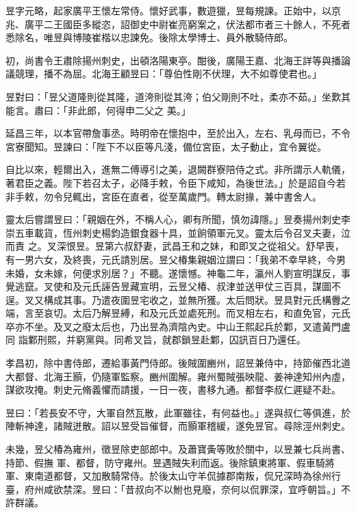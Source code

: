 \begin{pinyinscope}
 昱字元略，起家廣平王懷左常侍。懷好武事，數遊獵，昱每規諫。正始中，以京兆、廣平二王國臣多縱恣，詔御史中尉崔亮窮案之，伏法都市者三十餘人，不死者悉除名，唯昱與博陵崔楷以忠諫免。後除太學博士、員外散騎侍郎。



 初，尚書令王肅除揚州刺史，出頓洛陽東亭。酣後，廣陽王嘉、北海王詳等與播論議競理，播不為屈。北海王顧昱曰：「尊伯性剛不伏理，大不如尊使君也。」



 昱對曰：「昱父道隆則從其隆，道洿則從其洿；伯父剛則不吐，柔亦不茹。」坐歎其能言。肅曰：「非此郎，何得申二父之
 美。」



 延昌三年，以本官帶詹事丞。時明帝在懷抱中，至於出入，左右、乳母而已，不令宮寮聞知。昱諫曰：「陛下不以臣等凡淺，備位宮臣，太子動止，宜令翼從。



 自比以來，輕爾出入，進無二傅導引之美，退闕群寮陪侍之式。非所謂示人軌儀，著君臣之義。陛下若召太子，必降手敕，令臣下咸知，為後世法。」於是詔自今若非手敕，勿令兒輒出，宮臣在直者，從至萬歲門。轉太尉掾，兼中書舍人。



 靈太后嘗謂昱曰：「親姻在外，不稱人心，卿有所聞，慎勿諱隱。」昱奏揚州刺史李崇五車載貨，恆州刺史楊鈞造銀食器十具，並餉領軍元叉。靈太后令召叉夫妻，泣而責
 之。叉深恨昱。昱第六叔舒妻，武昌王和之妹，和即叉之從祖父。舒早喪，有一男六女，及終喪，元氏請別居。昱父椿集親姻泣謂曰：「我弟不幸早終，今男未婚，女未嫁，何便求別居？」不聽。遂懷憾。神龜二年，瀛州人劉宣明謀反，事覺逃竄。叉使和及元氏誣告昱藏宣明，云昱父椿、叔津並送甲仗三百具，謀圖不逞。叉又構成其事。乃遣夜圍昱宅收之，並無所獲。太后問狀。昱具對元氏構釁之端，言至哀切。太后乃解昱縛，和及元氏並處死刑。而叉相左右，和直免官，元氏卒亦不坐。及叉之廢太后也，乃出昱為濟陰內史。中山王熙起兵於鄴，叉遣黃門盧同
 詣鄴刑熙，并窮黨與。同希叉旨，就郡鎖昱赴鄴，囚訊百日乃還任。



 孝昌初，除中書侍郎，遷給事黃門侍郎。後賊圍豳州，詔昱兼侍中，持節催西北道大都督、北海王顥，仍隨軍監察。豳州圍解。雍州蜀賊張映龍、姜神達知州內虛，謀欲攻掩。刺史元脩義懼而請援，一日一夜，書移九通。都督李叔仁遲疑不赴。



 昱曰：「若長安不守，大軍自然瓦散，此軍雖往，有何益也。」遂與叔仁等俱進，於陣斬神達，諸賊迸散。詔以昱受旨催督，而顥軍稽緩，遂免昱官。尋除涇州刺史。



 未幾，昱父椿為雍州，徵昱除吏部郎中。及蕭寶夤等敗於關中，以昱兼七兵尚書、持節、假撫
 軍、都督，防守雍州。昱遇賊失利而返。後除鎮東將軍、假車騎將軍、東南道都督，又加散騎常侍。於後太山守羊侃據郡南叛，侃兄深時為徐州行臺，府州咸欲禁深。昱曰：「昔叔向不以鮒也見廢，奈何以侃罪深，宜呼朝旨。」不許群議。




\end{pinyinscope}
